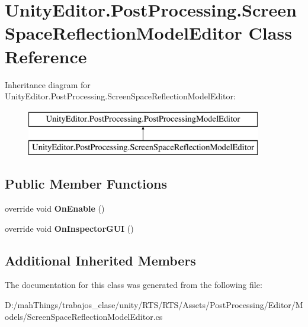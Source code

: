 \hypertarget{class_unity_editor_1_1_post_processing_1_1_screen_space_reflection_model_editor}{}\section{Unity\+Editor.\+Post\+Processing.\+Screen\+Space\+Reflection\+Model\+Editor Class Reference}
\label{class_unity_editor_1_1_post_processing_1_1_screen_space_reflection_model_editor}
Inheritance diagram for Unity\+Editor.\+Post\+Processing.\+Screen\+Space\+Reflection\+Model\+Editor\+:\begin{figure}[H]
\begin{center}
\leavevmode
\includegraphics[height=2.000000cm]{class_unity_editor_1_1_post_processing_1_1_screen_space_reflection_model_editor}
\end{center}
\end{figure}
\subsection*{Public Member Functions}
\begin{DoxyCompactItemize}
\item 
\mbox{\label{class_unity_editor_1_1_post_processing_1_1_screen_space_reflection_model_editor_a82b863023f5322483c601ce1bcc254d1}} 
override void {\bfseries On\+Enable} ()
\item 
\mbox{\label{class_unity_editor_1_1_post_processing_1_1_screen_space_reflection_model_editor_afa95d659e07fb98f2c08129dc2a51ca1}} 
override void {\bfseries On\+Inspector\+G\+UI} ()
\end{DoxyCompactItemize}
\subsection*{Additional Inherited Members}


The documentation for this class was generated from the following file\+:\begin{DoxyCompactItemize}
\item 
D\+:/mah\+Things/trabajos\+\_\+clase/unity/\+R\+T\+S/\+R\+T\+S/\+Assets/\+Post\+Processing/\+Editor/\+Models/Screen\+Space\+Reflection\+Model\+Editor.\+cs\end{DoxyCompactItemize}
